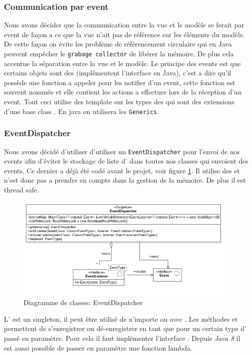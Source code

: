 \documentclass[report, backcover, french, nodocumentinfo]{upmethodology-document}
\begin{document}
			\subsubsection{Communication par event}
					Nous avons décider que la communication entre la vue et le modèle se ferait par event de façon a ce que la vue n'ait pas de référence sur les éléments du modèle. De cette façon on évite les problème de référencement circulaire qui en Java peuvent empêcher le \texttt{grabage collector} de libérer la mémoire. De plus cela accentue la séparation entre la vue et le modèle.
					Le principe des events est que certains objets sont des  (implémentent l'interface en Java), c'est a dire qu'il possède une fonction a appeler pour les notifier d'un event, cette fonction est souvent nommée  et elle contient les actions a effectuer lors de la réception d'un event. Tout ceci utilise des template sur les types des  qui sont des extensions d'une base class . En java on utilisera les \texttt{Generics}.
			\subsubsection{EventDispatcher}
				\p{}
					Nous avons décidé d'utiliser d'utiliser un \texttt{EventDispatcher} pour l'envoi de nos events afin d'éviter le stockage de liste d' dans toutes nos classes qui envoient des events. Ce dernier a déjà été codé avant le projet, voir figure \ref{fig:EventDispatcherClassDiagram}. Il utilise des  et n'est donc pas a prendre en compte dans la gestion de la mémoire. De plus il est thread safe.
					\begin{figure}[h!]
						\centering
						\includegraphics[width=\textwidth]{figures/EventDispatcherClassDiagram}
						\caption{Diagramme de classes: EventDispatcher}
						\label{fig:EventDispatcherClassDiagram}
					\end{figure}
					L' est un singleton, il peut être utilisé de n'importe ou avec . Les méthodes  et  permettent de s'enregistrer ou dé-enregistrer en tant que  pour un certain type d' passé en paramètre. Pour cela il faut implémenter l'interface . Depuis \textit{Java 8} il est aussi possible de passer en paramètre une fonction lambda.
\end{document}
